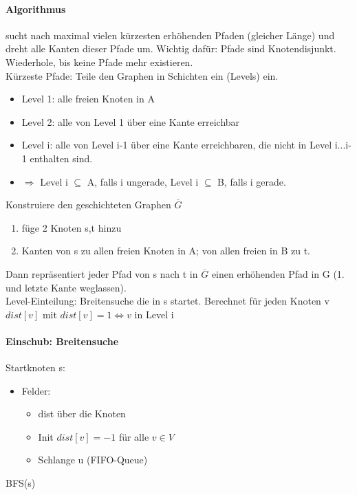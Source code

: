 \paragraph{Algorithmus} sucht nach maximal vielen kürzesten erhöhenden Pfaden (gleicher Länge) und dreht alle Kanten dieser Pfade um. Wichtig dafür: Pfade sind Knotendisjunkt. Wiederhole, bis keine Pfade mehr existieren. \\

Kürzeste Pfade: Teile den Graphen in Schichten ein (Levels) ein.
\begin{itemize}
    \item[] Level 1: alle freien Knoten in A
    \item[] Level 2: alle von Level 1 über eine Kante erreichbar
    \item[] Level i: alle von Level i-1 über eine Kante erreichbaren, die nicht in Level i...i-1 enthalten sind.
    \item[] $ \Rightarrow $ Level i $ \subseteq $ A, falls i ungerade, Level i $ \subseteq $ B, falls i gerade.
\end{itemize}
Konstruiere den geschichteten Graphen $ \overline{G} $
\begin{enumerate}
    \item füge 2 Knoten s,t hinzu
    \item Kanten von s zu allen freien Knoten in A; von allen freien in B zu t.
\end{enumerate}
Dann repräsentiert jeder Pfad von s nach t in $ \overline{G} $ einen erhöhenden Pfad in G (1. und letzte Kante weglassen). \\
Level-Einteilung: Breitensuche die in s startet. Berechnet für jeden Knoten v $ dist[v] $ mit $ dist[v] = 1 \Leftrightarrow v $ in Level i

\paragraph{Einschub: Breitensuche} Startknoten s:\\
\begin{itemize}
    \item Felder:
    \begin{itemize}
        \item dist über die Knoten
        \item Init $ dist[v] = -1 $ für alle $ v \in V $
        \item Schlange u (FIFO-Queue)
    \end{itemize}
\end{itemize}
BFS(s)

